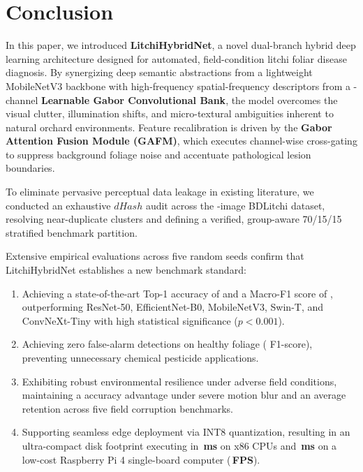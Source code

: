 \section{Conclusion}
\label{sec:conclusion}
In this paper, we introduced \textbf{LitchiHybridNet}, a novel dual-branch hybrid deep learning architecture designed for automated, field-condition litchi foliar disease diagnosis. By synergizing deep semantic abstractions from a lightweight MobileNetV3 backbone with high-frequency spatial-frequency descriptors from a \gaborChannels{}-channel \textbf{Learnable Gabor Convolutional Bank}, the model overcomes the visual clutter, illumination shifts, and micro-textural ambiguities inherent to natural orchard environments. Feature recalibration is driven by the \textbf{Gabor Attention Fusion Module (GAFM)}, which executes channel-wise cross-gating to suppress background foliage noise and accentuate pathological lesion boundaries.

To eliminate pervasive perceptual data leakage in existing literature, we conducted an exhaustive $dHash$ audit across the \totalImages{}-image BDLitchi dataset, resolving \nearDupGroups{} near-duplicate clusters and defining a verified, group-aware 70/15/15 stratified benchmark partition.

Extensive empirical evaluations across five random seeds confirm that LitchiHybridNet establishes a new benchmark standard:
\begin{enumerate}
    \item Achieving a state-of-the-art Top-1 accuracy of \textbf{\accMain{}} and a Macro-F1 score of \textbf{\fOneMain{}}, outperforming ResNet-50, EfficientNet-B0, MobileNetV3, Swin-T, and ConvNeXt-Tiny with high statistical significance ($p < 0.001$).
    \item Achieving zero false-alarm detections on healthy foliage (\healthyLeafFOne{} F1-score), preventing unnecessary chemical pesticide applications.
    \item Exhibiting robust environmental resilience under adverse field conditions, maintaining a \textbf{\robustnessGain{}} accuracy advantage under severe motion blur and an average \textbf{\meanCorruptionProposed{}} retention across five field corruption benchmarks.
    \item Supporting seamless edge deployment via INT8 quantization, resulting in an ultra-compact \textbf{\modelSizeQuantMB{}} disk footprint executing in \textbf{\cpuLatencyMS{}\,ms} on x86 CPUs and \textbf{\rpiLatencyMS{}\,ms} on a low-cost Raspberry Pi 4 single-board computer (\textbf{\rpiFPS{}\,FPS}).
\end{enumerate}

